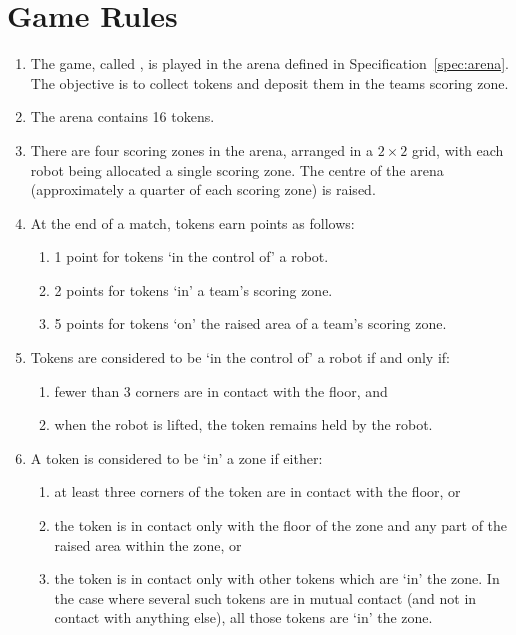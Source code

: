 \section{Game Rules}
\label{sec:rules}

\begin{enumerate}
  \item The game, called \emph{\gamename}, is played in the arena defined in
        Specification~\ref{spec:arena}. The objective is to collect tokens and
        deposit them in the teams scoring zone.
  \item The arena contains 16 tokens.
  \item There are four scoring zones in the arena, arranged in a $2\times2$
        grid, with each robot being allocated a single scoring zone. The centre
        of the arena (approximately a quarter of each scoring zone) is raised.
  \item At the end of a match, tokens earn points as follows:
    \begin{enumerate}
      \item 1 point for tokens `in the control of' a robot.
      \item 2 points for tokens `in' a team's scoring zone.
      \item 5 points for tokens `on' the raised area of a team's scoring zone.
    \end{enumerate}
  \item Tokens are considered to be `in the control of' a robot if and only if:
    \begin{enumerate}
      \item fewer than 3 corners are in contact with the floor, and
      \item when the robot is lifted, the token remains held by the robot.
    \end{enumerate}
  \item A token is considered to be `in' a zone if either:
    \begin{enumerate}
      \item at least three corners of the token are in contact with the floor, or
      \item the token is in contact only with the floor of the zone and any part
            of the raised area within the zone, or
      \item the token is in contact only with other tokens which are `in' the zone.
            In the case where several such tokens are in mutual contact (and not in
            contact with anything else), all those tokens are `in' the zone.

\end{enumerate}
\end{enumerate}
